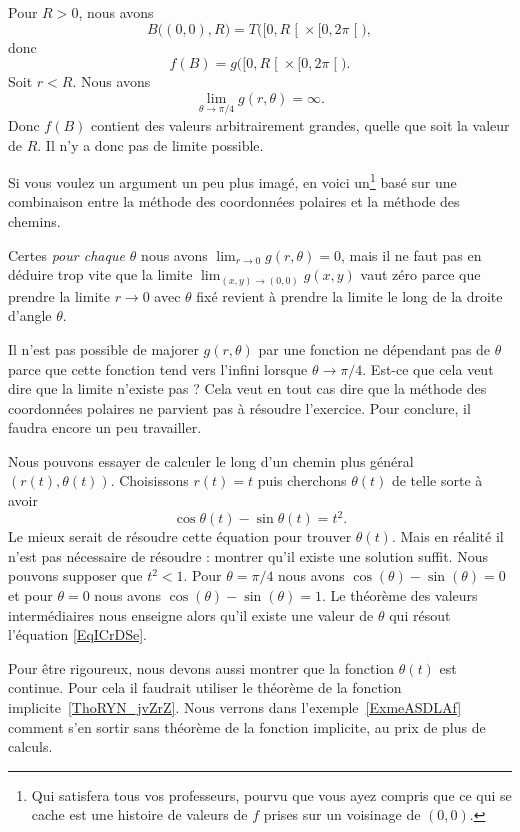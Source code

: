 \begin{example}
	Pour \( R>0\), nous avons
	\begin{equation}
		B\big( (0,0),R \big)=T\big( \mathopen[ 0 , R \mathclose[\times \mathopen[ 0 , 2\pi \mathclose[ \big),
	\end{equation}
	donc
	\begin{equation}
		f(B)=g\big( \mathopen[ 0 , R \mathclose[\times \mathopen[ 0 , 2\pi \mathclose[ \big).
	\end{equation}
	Soit \( r<R\). Nous avons
	\begin{equation}
		\lim_{\theta\to \pi/4} g(r,\theta)=\infty.
	\end{equation}
	Donc \( f(B)\) contient des valeurs arbitrairement grandes, quelle que soit la valeur de \( R\). Il n'y a donc pas de limite possible.

	Si vous voulez un argument un peu plus imagé, en voici un\footnote{Qui satisfera tous vos professeurs, pourvu que vous ayez compris que ce qui se cache est une histoire de valeurs de \( f\) prises sur un voisinage de \( (0,0)\).} basé sur une combinaison entre la méthode des coordonnées polaires et la méthode des chemins.

	Certes \emph{pour chaque $\theta$} nous avons $\lim_{r\to 0} g(r,\theta)=0$, mais il ne faut pas en déduire trop vite que la limite $\lim_{(x,y)\to(0,0)}g(x,y)$ vaut zéro parce que prendre la limite $r\to 0$ avec $\theta$ fixé revient à prendre la limite le long de la droite d'angle $\theta$.

	Il n'est pas possible de majorer $g(r,\theta)$ par une fonction ne dépendant pas de $\theta$ parce que cette fonction tend vers l'infini lorsque $\theta\to\pi/4$. Est-ce que cela veut dire que la limite n'existe pas ? Cela veut en tout cas dire que la méthode des coordonnées polaires ne parvient pas à résoudre l'exercice. Pour conclure, il faudra encore un peu travailler.

	Nous pouvons essayer de calculer le long d'un chemin plus général \( (r(t),\theta(t))\). Choisissons \( r(t)=t\) puis cherchons \( \theta(t)\) de telle sorte à avoir
	\begin{equation}        \label{EqICrDSe}
		\cos\theta(t)-\sin\theta(t)=t^2.
	\end{equation}
	Le mieux serait de résoudre cette équation pour trouver \( \theta(t)\). Mais en réalité il n'est pas nécessaire de résoudre : montrer qu'il existe une solution suffit. Nous pouvons supposer que \( t^2<1\). Pour \( \theta=\pi/4\) nous avons \( \cos(\theta)-\sin(\theta)=0\) et pour \( \theta=0\) nous avons \( \cos(\theta)-\sin(\theta)=1\). Le théorème des valeurs intermédiaires nous enseigne alors qu'il existe une valeur de \( \theta\) qui résout l'équation \eqref{EqICrDSe}.

	Pour être rigoureux, nous devons aussi montrer que la fonction \( \theta(t)\) est continue. Pour cela il faudrait utiliser le théorème de la fonction implicite~\ref{ThoRYN_jvZrZ}.
	Nous verrons dans l'exemple~\ref{ExmeASDLAf} comment s'en sortir sans théorème de la fonction implicite, au prix de plus de calculs.
\end{example}

